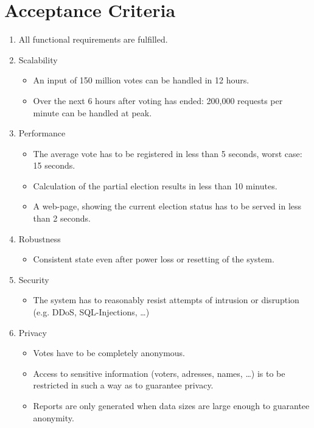 \documentclass[10pt,a4paper]{article}
\begin{document}
	\section*{Acceptance Criteria}
	\begin{enumerate}
		\item \label{fuctio} All functional requirements are fulfilled.
		\item  \label{scala} Scalability
			\begin{itemize}
				\item An input of 150 million votes can be handled in 12 hours.
				\item Over the next 6 hours after voting has ended: 200,000 requests per minute can be handled at peak. 
			\end{itemize} 
		\item  \label{perf} Performance
			\begin{itemize}
				\item The average vote has to be registered in less than 5 seconds, worst case: 15 seconds.
				\item Calculation of the partial election results in less than 10 minutes.
				\item A web-page, showing the current election status has to be served in less than 2 seconds.
			\end{itemize}
		\item  \label{rob} Robustness
			\begin{itemize}
				\item Consistent state even after power loss or resetting of the system.
			\end{itemize}
			
		\item \label{safe} Security
			\begin{itemize}
				\item The system has to reasonably resist attempts of intrusion or disruption (e.g. DDoS, SQL-Injections, \dots)
			\end{itemize}
		
		\item \label{privacy} Privacy
			\begin{itemize}
				\item Votes have to be completely anonymous.
				\item Access to sensitive information (voters, adresses, names, \dots) is to be restricted in such a way as to guarantee privacy.
				\item Reports are only generated when data sizes are large enough to guarantee anonymity.
			\end{itemize}
	\end{enumerate}
\end{document}
